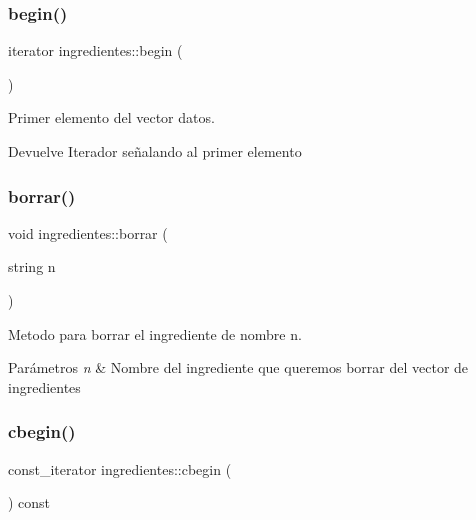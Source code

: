 \subsubsection{\texorpdfstring{begin()}{begin()}}
{\footnotesize\ttfamily iterator ingredientes\+::begin (\begin{DoxyParamCaption}{ }\end{DoxyParamCaption})\hspace{0.3cm}{\ttfamily [inline]}}



Primer elemento del vector datos. 

\begin{DoxyReturn}{Devuelve}
Iterador señalando al primer elemento 
\end{DoxyReturn}
\mbox{\label{classingredientes_a71bde8efdf96c22f0f27ab9cc6e50466}} 
\subsubsection{\texorpdfstring{borrar()}{borrar()}}
{\footnotesize\ttfamily void ingredientes\+::borrar (\begin{DoxyParamCaption}\item[{string}]{n }\end{DoxyParamCaption})}



Metodo para borrar el ingrediente de nombre n. 


\begin{DoxyParams}{Parámetros}
{\em n} & Nombre del ingrediente que queremos borrar del vector de ingredientes \\
\hline
\end{DoxyParams}
\mbox{\label{classingredientes_a40fdccf1fc4542ea0774a79cfc83e070}} 
\subsubsection{\texorpdfstring{cbegin()}{cbegin()}}
{\footnotesize\ttfamily const\+\_\+iterator ingredientes\+::cbegin (\begin{DoxyParamCaption}{ }\end{DoxyParamCaption}) const\hspace{0.3cm}{\ttfamily [inline]}}



